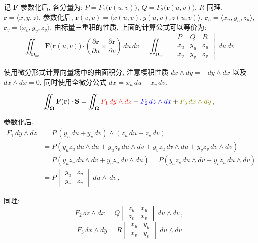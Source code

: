 \documentclass[UTF8]{ctexart}
\newcommand{\ve}[1]{\boldsymbol{\mathbf{#1}}}
\begin{document}
记 $ \ve{F} $ 参数化后, 各分量为: $ P = F_1 \big( \ve{r}(u, v) \big) $, $ Q = F_2 \big( \ve{r}(u, v) \big) $, $ R $ 同理. $ \ve{r} = \langle x, y, z \rangle $, 参数化后, $ \ve{r}(u, v) = \langle x(u, v), y(u, v), z(u, v) \rangle $. $ \ve{r}_u = \langle x_u, y_u, z_u \rangle $, $ \ve{r}_v = \langle x_v, y_v, z_v \rangle $. 由标量三重积的性质, 上面的计算公式可以等价为:
\[ \iint_{\ve{\Omega}_{uv}} \ve{F} \big( \ve{r} (u, v) \big) \cdot \left( \dfrac{\partial \ve{r}}{\partial u} \times \dfrac{\partial \ve{r}}{\partial v} \right) \,du\,dv = \iint_{\ve{\Omega}_{uv}} \begin{vmatrix}
    P & Q & R \\
    x_u & y_u & z_u \\
    x_v & y_v & z_v
\end{vmatrix} \,du\,dv \tag{$ * $}\]

使用微分形式计算向量场中的曲面积分, 注意楔积性质 $ dx \land dy = - dy \land dx $ 以及 $ dx \land dx = 0 $, 同时使用全微分公式 $ dx = x_u\,du + x_v \,dv $. 
\begin{thmbox}
    \[ \iint_{\ve{\Omega}} \ve{F} (\ve{r}) \cdot \ve{S} = \iint_{\ve{\Omega}} {\color{red} F_1 \,dy\land dz} + {\color{blue} F_2 \,dz \land dx} + {\color{olive} F_3 \,dx \land dy} \,,\]
\end{thmbox}

参数化后:
\begin{align*}
    F_1 \,dy \land dz &= P \, (y_u \,du + y_v \,dv) \land (z_u \,du + z_v \, dv) \\
    &= P (y_u z_u \,du \land du + y_u z_v \,du\land dv + y_v z_u \, dv \land du + y_v z_v \,dv \land dv ) \\
    &= P (y_u z_v \,du \land dv + y_v z_u \,dv \land du) 
    = P (y_u z_v \,du \land dv - y_v z_u \,du \land dv) \\
    &= P \begin{vmatrix}
        y_u & z_u \\
        y_v & z_v 
    \end{vmatrix} \,du \land \,dv \,,
\end{align*}

同理: 
\[ F_2 \, dz \land dx = Q \begin{vmatrix}
    z_u & x_u \\
    z_v & x_v
\end{vmatrix} \, du \land dv \,,\]
\[ F_3 \,dx \land dy = R \begin{vmatrix}
    x_u & y_u \\
    x_v & y_v
\end{vmatrix} \, du \land dv \]
\end{document}
